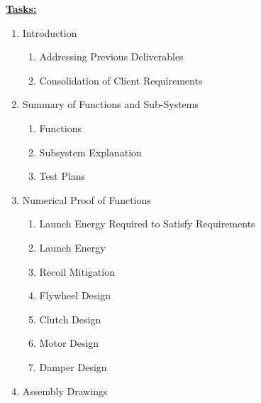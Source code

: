 \documentclass[a4paper,10pt]{article} %
\begin{document}
\underline{\textbf{Tasks:}}
\smallskip
\begin{enumerate}[label=\arabic*.]
    \item Introduction
    
    \begin {enumerate}[label*=\arabic*]
    
        \item Addressing Previous Deliverables
        
        \item Consolidation of Client Requirements
        
    \end{enumerate}

    \item Summary of Functions and Sub-Systems

    \begin{enumerate}[label*=\arabic*]
    
        \item Functions

        \item Subsystem Explanation

        \item Test Plans
        
    \end{enumerate}

    \item Numerical Proof of Functions
    
    \begin{enumerate}[label*=\arabic*.]
    
        \item Launch Energy Required to Satisfy Requirements

        \item Launch Energy

        \item Recoil Mitigation

        \item Flywheel Design

        \item Clutch Design

        \item Motor Design

        \item Damper Design

    \end{enumerate}

    \item Assembly Drawings


\end{enumerate}
\end{document}

